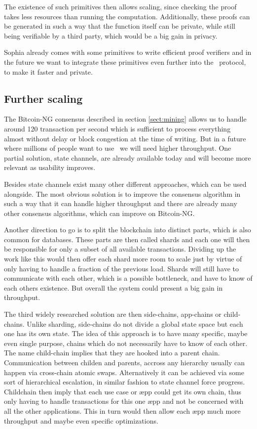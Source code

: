 The existence of such primitives then allows scaling, since checking the
proof takes less resources than running the computation. Additionally, these
proofs can be generated in such a way that the function itself can be private,
while still being verifiable by a third party, which would be a big gain in
privacy.

Sophia already comes with some primitives to write efficient proof verifiers
and in the future we want to integrate these primitives even further into the
\aet\ protocol, to make it faster and private.

\subsection{Further scaling}

The Bitcoin-NG consensus described in section \ref{sect:mining} allows us to
handle around 120 transaction per second which is sufficient to process
everything almost without delay or block congestion at the time of writing.
But in a future where millions of people want to use \aet\ we will need higher
throughput. One partial solution, state channels, are already available today
and will become more relevant as usability improves.

Besides state channels exist many other different approaches, which can be used
alongside. The most obvious solution is to improve the consensus algorithm in
such a way that it can handle higher throughput and there are already many
other consensus algorithms, which can improve on Bitcoin-NG.

Another direction to go is to split the blockchain into distinct parts, which
is also common for databases. These parts are then called shards and each one
will then be responsible for only a subset of all available transactions.
Dividing up the work like this would then offer each shard more room to scale
just by virtue of only having to handle a fraction of the previous load. Shards
will still have to communicate with each other, which is a possible bottleneck,
and have to know of each others existence. But overall the system could present
a big gain in throughput.

The third widely researched solution are then side-chains, app-chains or
child-chains.
Unlike sharding, side-chains do not divide a global state space but each
one has its own state. The idea of this approach is to have many specific,
maybe even single purpose, chains which do not necessarily have to know of each
other. The name child-chain implies that they are
hooked into a parent chain. Communication between childen and parents, accross
any hierarchy usually can happen via cross-chain atomic swaps. Alternatively it
can be achieved via some sort of hierarchical escalation, in similar fashion to
state channel force progress.
Childchain then imply that each use case or æpp could get its own chain,
thus only having to handle transactions for this one æpp and not be concerned
with all the other applications. This in turn would then allow each æpp much
more throughput and maybe even specific optimizations.


